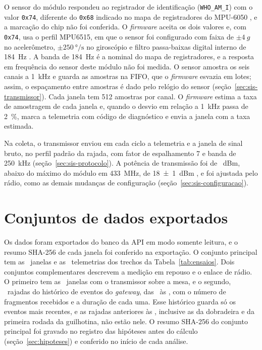 O sensor do módulo respondeu ao registrador de identificação (\texttt{WHO\_AM\_I}) com o valor \texttt{0x74}, diferente do \texttt{0x68} indicado no mapa de registradores do MPU-6050 \cite{invensense2012rm}, e a marcação do chip não foi conferida. O \textit{firmware} aceita os dois valores e, com \texttt{0x74}, usa o perfil MPU6515, em que o sensor foi configurado com faixa de $\pm\SI{4}{g}$ no acelerômetro, $\pm\SI{250}{\degree\per\second}$ no giroscópio e filtro passa-baixas digital interno de \SI{184}{\hertz} \cite{invensense2012rm}. A banda de \SI{184}{\hertz} é a nominal do mapa de registradores, e a resposta em frequência do sensor deste módulo não foi medida. O sensor amostra os seis canais a \SI{1}{\kilo\hertz} e guarda as amostras na FIFO, que o \textit{firmware} esvazia em lotes; assim, o espaçamento entre amostras é dado pelo relógio do sensor (seção~\ref{sec:sis-transmissor}). Cada janela tem \num{512} amostras por canal. O \textit{firmware} estima a taxa de amostragem de cada janela e, quando o desvio em relação a \SI{1}{\kilo\hertz} passa de \SI{2}{\percent}, marca a telemetria com código de diagnóstico e envia a janela com a taxa estimada.

Na coleta, o transmissor enviou em cada ciclo a telemetria e a janela de sinal bruto, no perfil padrão da rajada, com fator de espalhamento 7 e banda de \SI{250}{\kilo\hertz} (seção~\ref{sec:sis-protocolo}). A potência de transmissão foi de \campoPotenciaTx~dBm, abaixo do máximo do módulo em \SI{433}{\mega\hertz}, de \SI{18 \pm 1}{dBm} \cite{aithinker2017ra02}, e foi ajustada pelo rádio, como as demais mudanças de configuração (seção~\ref{sec:sis-configuracao}).

\section{Conjuntos de dados exportados}\label{sec:dados}

Os dados foram exportados do banco da API em modo somente leitura, e o resumo SHA-256 de cada janela foi conferido na exportação. O conjunto principal tem as \campoJanelas\ janelas e as \campoLeituras\ telemetrias dos trechos da Tabela~\ref{tab:ensaios}. Dois conjuntos complementares descrevem a medição em repouso e o enlace de rádio. O primeiro tem as \campoJanelasRepouso\ janelas com o transmissor sobre a mesa, e o segundo, \campoRajadas\ rajadas do histórico de eventos do \textit{gateway}, das \campoRajadasInicio\ às \campoRajadasFim, com o número de fragmentos recebidos e a duração de cada uma. Esse histórico guarda só os eventos mais recentes, e as rajadas anteriores às \campoRajadasInicio, inclusive as da dobradeira e da primeira rodada da guilhotina, não estão nele. O resumo SHA-256 do conjunto principal foi gravado no registro das hipóteses antes do cálculo (seção~\ref{sec:hipoteses}) e conferido no início de cada análise.

